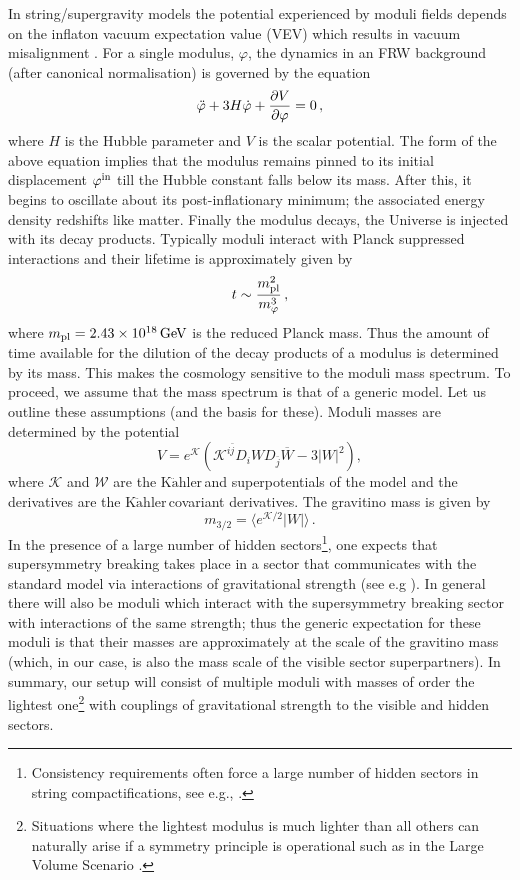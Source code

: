 \documentclass[12pt]{article}
\numberwithin{equation}{section}
\newcommand{\Kahler}{\ensuremath{\text{K}\ddot{\text{a}}\text{hler}\,}}
\begin{document}
In string/supergravity models the potential experienced by moduli fields depends on the inflaton vacuum expectation value (VEV) which results in
vacuum misalignment \cite{mismatch}. For a single modulus, $\varphi$, the dynamics in an  FRW background (after canonical normalisation) is
governed by the equation %
$$
\ddot{\varphi} + 3H \dot{\varphi} + {\partial V \over \partial{\varphi}} = 0 \,,
$$
%
where $H$ is the Hubble parameter and $V$ is the scalar potential. The form of the above equation implies
that the modulus remains pinned to its initial displacement $\varphi^{\rm in}$ till the Hubble constant falls below its mass. After this, it begins
to oscillate about its post-inflationary minimum; the associated energy density redshifts like matter. Finally the modulus decays, the Universe is injected
with its decay products. Typically moduli interact with Planck suppressed interactions and their lifetime is approximately given by 
%
$$
   t  \sim   { m^2_{\rm pl}  \over m_{\varphi}^3 } \, ,
$$
%
where $m_{\rm pl} = 2.43 \times 10^{18} \, \text{GeV}$ is the reduced Planck mass. Thus the amount of time available for the dilution of the decay products of a modulus is determined  by its mass. This makes the cosmology sensitive
to the moduli mass spectrum. To proceed, we assume that the mass spectrum is that of a generic model. Let us outline these assumptions (and the basis for these).
Moduli masses are determined by the potential
%
$$
     V = e^{{\mathcal{K}}} \left( \mathcal{K}^{i \bar{j}} D_{i} W D_{\bar{j}}  \overline{W} -  3 |W|^2 \right),
$$
%
where $\mathcal{K}$ and $\mathcal{W}$ are the \Kahler and superpotentials of the model and the derivatives are the \Kahler covariant derivatives.
The gravitino mass is given by 
%
$$
  m_{3/2} = \langle e^{\mathcal{K}/2} |W| \rangle \, .
$$
%
In the presence of a large number of hidden sectors\footnote{Consistency requirements
often force a large number of hidden sectors in string compactifications, see e.g.,  \cite{hidden, hreview}.},  one expects that supersymmetry breaking
takes place in a sector that communicates with the standard model via interactions of gravitational strength (see e.g \cite{MSUGRA, rewsbtwo, pk, douglas}).
In general there will also be moduli which interact with the supersymmetry breaking sector with interactions of the same strength; thus 
the generic expectation for these moduli is that their masses are approximately at the scale of the gravitino mass (which, in our case, is also the
mass scale of the visible sector superpartners). In summary, our setup  will consist of multiple moduli
with masses of order the lightest one\footnote{Situations where the lightest modulus is much lighter than all others can naturally arise if a
symmetry principle is operational such as in the Large Volume Scenario \cite{bala}.} with couplings of gravitational strength  to the visible and hidden sectors.
\end{document}
